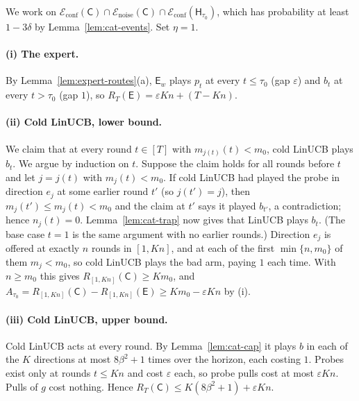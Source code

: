 \documentclass{article}
\theoremstyle{definition}
\theoremstyle{remark}
\newcommand{\eps}{\varepsilon}
\theoremstyle{remark}
\newcommand{\Cold}{\mathsf{C}}
\newcommand{\Exp}{\mathsf{E}}
\newcommand{\Hyb}{\mathsf{H}}
\begin{document}
We work on $\mathcal E_{\mathrm{conf}}(\Cold)\cap\mathcal E_{\mathrm{noise}}(\Cold)\cap\mathcal E_{\mathrm{conf}}(\Hyb_{\tau_0})$,
which has probability at least $1-3\delta$ by Lemma~\ref{lem:cat-events}. Set
$\eta=1$.

\paragraph{(i) The expert.}
By Lemma~\ref{lem:expert-routes}(a), $\Exp_w$ plays $p_t$ at every $t\le\tau_0$
(gap $\eps$) and $b_t$ at every $t>\tau_0$ (gap $1$), so $R_T(\Exp)=\eps Kn+(T-Kn)$.

\paragraph{(ii) Cold LinUCB, lower bound.}
We claim that at every round $t\in[T]$ with $m_{j(t)}(t)<m_0$, cold LinUCB
plays $b_t$. We argue by induction on $t$. Suppose the claim holds for all
rounds before $t$ and let $j=j(t)$ with $m_j(t)<m_0$. If cold LinUCB had
played the probe in direction $e_j$ at some earlier round $t'$ (so $j(t')=j$),
then $m_j(t')\le m_j(t)<m_0$ and the claim at $t'$ says it played $b_{t'}$,
a contradiction; hence $n_j(t)=0$. Lemma~\ref{lem:cat-trap} now gives that
LinUCB plays $b_t$. (The base case $t=1$ is the same argument with no earlier
rounds.) Direction $e_j$ is offered at exactly $n$ rounds in $[1,Kn]$, and at
each of the first $\min\{n,m_0\}$ of them $m_j<m_0$, so cold LinUCB plays the
bad arm, paying $1$ each time. With $n\ge m_0$ this gives $R_{[1,Kn]}(\Cold)\ge Km_0$,
and $A_{\tau_0}=R_{[1,Kn]}(\Cold)-R_{[1,Kn]}(\Exp)\ge Km_0-\eps Kn$ by (i).

\paragraph{(iii) Cold LinUCB, upper bound.}
Cold LinUCB acts at every round. By Lemma~\ref{lem:cat-cap} it plays $b$ in
each of the $K$ directions at most $8\beta^2+1$ times over the horizon, each
costing $1$. Probes exist only at rounds $t\le Kn$ and cost $\eps$ each, so
probe pulls cost at most $\eps Kn$. Pulls of $g$ cost nothing. Hence
$R_T(\Cold)\le K(8\beta^2+1)+\eps Kn$.
\end{document}
